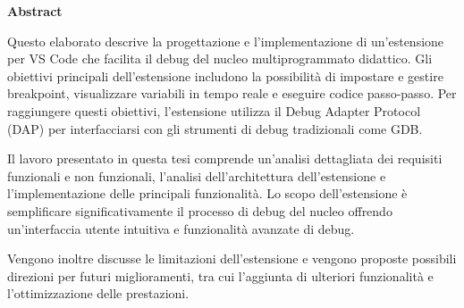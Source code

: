 \begin{center}
    \LARGE{\bf Abstract}
    \vspace{5mm}
\end{center}

Questo elaborato descrive la progettazione e l'implementazione di un'estensione per VS Code che facilita il debug
del nucleo multiprogrammato didattico. Gli obiettivi principali dell'estensione includono la possibilità di
impostare e gestire breakpoint,
visualizzare variabili in tempo reale e eseguire codice passo-passo. Per raggiungere questi
obiettivi, l'estensione utilizza il Debug Adapter Protocol (DAP) per interfacciarsi con gli strumenti di debug
tradizionali come GDB.

Il lavoro presentato in questa tesi comprende un'analisi dettagliata dei requisiti funzionali e non funzionali,
l'analisi dell'architettura dell'estensione e l'implementazione delle principali funzionalità.
Lo scopo dell'estensione è semplificare significativamente il processo di debug del nucleo
offrendo un'interfaccia utente intuitiva e funzionalità avanzate di debug.

Vengono inoltre discusse le limitazioni dell'estensione e vengono proposte possibili direzioni per futuri miglioramenti,
tra cui l'aggiunta di ulteriori funzionalità e l'ottimizzazione delle prestazioni.
